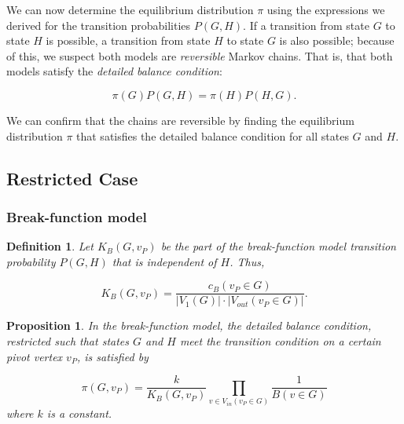 \documentclass[a4paper,10pt]{article}
\newtheorem{defn}{Definition}
\newtheorem{prop}{Proposition}
\begin{document}
We can now determine the equilibrium distribution $\pi$ using the expressions we derived for the transition probabilities $P(G, H)$. If a transition from state $G$ to state $H$ is possible, a transition from state $H$ to state $G$ is also possible; because of this, we suspect both models are \emph{reversible} Markov chains. That is, that both models satisfy the \emph{detailed balance condition}:

\begin{equation}
 \pi(G) P(G, H) = \pi(H) P(H, G).
\end{equation}

We can confirm that the chains are reversible by finding the equilibrium distribution $\pi$ that satisfies the detailed balance condition for all states $G$ and $H$. 

\subsection{Restricted Case}

\subsubsection{Break-function model}
\begin{defn}
 Let $K_B(G, v_P)$ be the part of the break-function model transition probability $P(G, H)$ that is independent of $H$. Thus,

\begin{equation}
 K_B(G, v_P) = \frac{c_B(v_P \in G)}{|V_1(G)| \cdot |V_{out}(v_P \in G)|}.
\end{equation}
 
\end{defn}

\begin{prop}
\label{prop:break-restricted}
 In the break-function model, the detailed balance condition, restricted such that states $G$ and $H$ meet the transition condition on a certain pivot vertex $v_P$, is satisfied by

 \begin{equation}
 \label{eqn:pi-k1-break}
  \pi(G, v_P) = \frac{k}{K_B(G, v_P)} 
 \prod \limits_{v \in V_{in}(v_P \in G)} \frac{1}{B(v \in G)}
 \end{equation}
where $k$ is a constant.
\end{prop}
\end{document}
